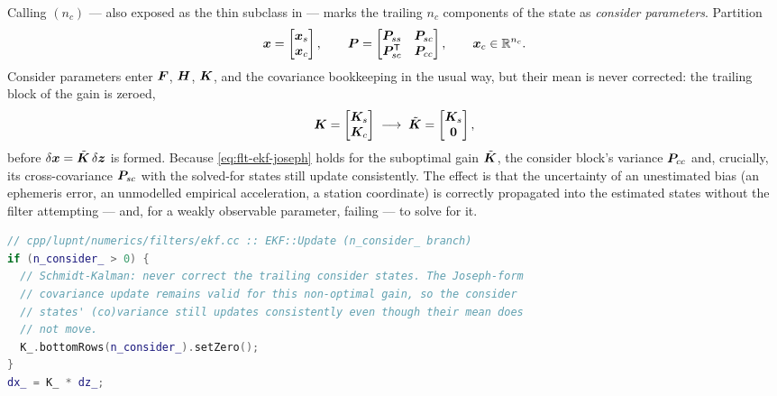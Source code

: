 Calling $(n_c)$ --- also exposed as the thin
subclass  in  --- marks the trailing $n_c$
components of the state as \emph{consider parameters}. Partition
\begin{equation}
  \label{eq:flt-schmidt-part}
  \bm{x} = \begin{bmatrix} \bm{x}_s \\ \bm{x}_c \end{bmatrix},
  \qquad
  \bm{P} = \begin{bmatrix}
    \bm{P}_{ss} & \bm{P}_{sc} \\
    \bm{P}_{sc}^{\mathsf{T}} & \bm{P}_{cc}
  \end{bmatrix},
  \qquad
  \bm{x}_c \in \mathbb{R}^{n_c} .
\end{equation}
Consider parameters enter $\bm{F}$, $\bm{H}$, $\bm{K}$, and the covariance
bookkeeping in the usual way, but their mean is never corrected: the trailing
block of the gain is zeroed,
\begin{equation}
  \label{eq:flt-schmidt-gain}
  \bm{K} =
  \begin{bmatrix} \bm{K}_s \\ \bm{K}_c \end{bmatrix}
  \;\longrightarrow\;
  \tilde{\bm{K}} =
  \begin{bmatrix} \bm{K}_s \\ \bm{0} \end{bmatrix} ,
\end{equation}
before $\delta \bm{x} = \tilde{\bm{K}}\,\delta \bm{z}$ is formed. Because
\cref{eq:flt-ekf-joseph} holds for the suboptimal gain $\tilde{\bm{K}}$, the
consider block's variance $\bm{P}_{cc}$ and, crucially, its cross-covariance
$\bm{P}_{sc}$ with the solved-for states still update consistently. The effect
is that the uncertainty of an unestimated bias (an ephemeris error, an
unmodelled empirical acceleration, a station coordinate) is correctly
propagated into the estimated states without the filter attempting --- and, for
a weakly observable parameter, failing --- to solve for it.

\begin{lstlisting}[language=cpp, caption={Schmidt/consider gain truncation.},
                   label={lst:flt-schmidt}]
// cpp/lupnt/numerics/filters/ekf.cc :: EKF::Update (n_consider_ branch)
if (n_consider_ > 0) {
  // Schmidt-Kalman: never correct the trailing consider states. The Joseph-form
  // covariance update remains valid for this non-optimal gain, so the consider
  // states' (co)variance still updates consistently even though their mean does
  // not move.
  K_.bottomRows(n_consider_).setZero();
}
dx_ = K_ * dz_;
\end{lstlisting}

